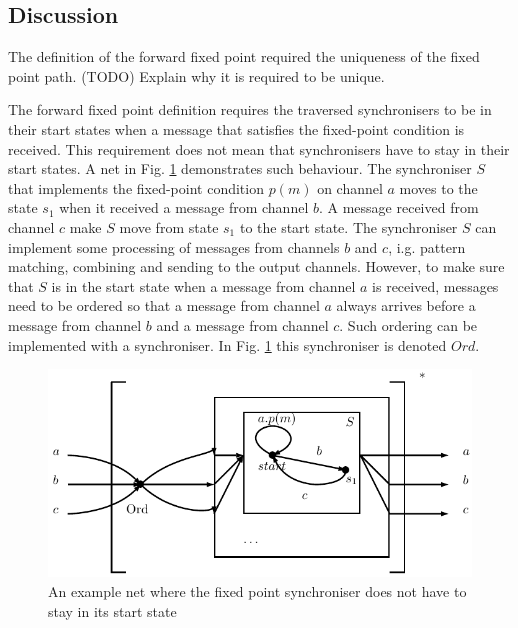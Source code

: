     \subsection{Discussion\label{ffp_discussion}}
The definition of the forward fixed point required the uniqueness of the fixed point path. (TODO) Explain why it is required to be unique.

The forward fixed point definition requires the traversed synchronisers to be in their start states when a message that satisfies the fixed-point condition is received. This requirement does not mean that synchronisers have to stay in their start states. A net in Fig. \ref{fig:ffp_net} demonstrates such behaviour. The synchroniser $S$ that implements the fixed-point condition $p(m)$ on channel $a$ moves to the state $s_1$ when it received a message from channel $b$. A message received from channel $c$ make $S$ move from state $s_1$ to the start state. The synchroniser $S$ can implement some processing of messages from channels $b$ and $c$, i.g. pattern matching, combining and sending to the output channels. However, to make sure that $S$ is in the start state when a message from channel $a$ is received, messages need to be ordered so that a message from channel $a$ always arrives before a message from channel $b$ and a message from channel $c$. Such ordering can be implemented with a synchroniser. In Fig. \ref{fig:ffp_net} this synchroniser is denoted $Ord$.

  \begin{figure}[h!]
  \centering
  \includegraphics{figs/chapter_04_ffp_net.pdf}
  \caption{An example net where the fixed point synchroniser does not have to stay in its start state}
  \label{fig:ffp_net}
  \end{figure}

